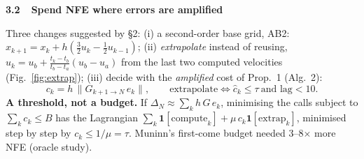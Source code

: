 \documentclass[final]{beamer}
\newcommand{\sub}[1]{\par\vskip0.08cm{\sffamily\bfseries\large\color{navy}#1}\par\vskip0.02cm}
\newcounter{fig}\newcounter{tab}
\newlength{\margin}\setlength{\margin}{1.6cm}
\newlength{\colgap}\setlength{\colgap}{1.3cm}
\newlength{\leftw}\setlength{\leftw}{27.0cm}
\newlength{\rightw}\setlength{\rightw}{\dimexpr\paperwidth-2\margin-\colgap-\leftw\relax}
\newlength{\bodyh}\setlength{\bodyh}{66.8cm}
\begin{document}
\begin{frame}[t]
\begin{minipage}[t][\bodyh][t]{\rightw}
\sub{3.2\ \ Spend NFE where errors are amplified}
Three changes suggested by \S2: (i) a second-order base grid, AB2:
$x_{k+1}=x_k+h(\tfrac32u_k-\tfrac12u_{k-1})$; (ii) \emph{extrapolate} instead of reusing,
$\hat u_k=u_b+\frac{t_k-t_b}{t_b-t_a}(u_b-u_a)$ from the last two computed velocities (Fig.~\ref{fig:extrap});
(iii) decide with the \emph{amplified} cost of Prop.~1 (Alg.~2):
\begin{equation}
  c_k=h\,\lVert G_{k+1\to N}\,e_k\rVert,\qquad\text{extrapolate}\iff\hat c_k\le\tau\ \text{and lag}<10 .
\end{equation}
\textbf{A threshold, not a budget.} If $\Delta_N\approx\sum_k h\,G\,e_k$, minimising the calls subject to
$\sum_kc_k\le B$ has the Lagrangian $\sum_k\mathbf{1}[\mathrm{compute}_k]+\mu\,c_k\mathbf{1}[\mathrm{extrap}_k]$,
minimised step by step by $c_k\le1/\mu=\tau$. Muninn's first-come budget needed 3--8$\times$ more NFE (oracle study).


\end{minipage}
\end{frame}
\end{document}
